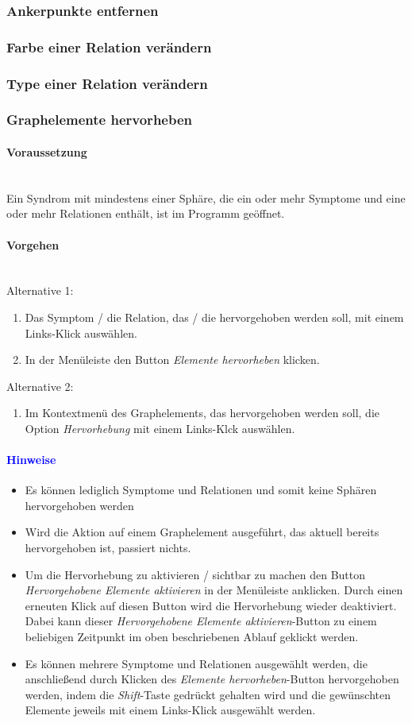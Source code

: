 \documentclass[enabledeprecatedfontcommands,fontsize=11pt,paper=a4,twoside]{scrartcl}
\newcounter{one}
\newcommand*{\hint}{\paragraph{\textcolor{blue}{Hinweise}}}
\newcommand*{\condition}{\paragraph{Voraussetzung}$\;$ \vspace{0.2cm}\\}
\newcommand*{\actions}{\paragraph{Vorgehen} $\;$\vspace{0.2cm}\\}
\begin{document}
		\subsubsection{Ankerpunkte entfernen}
		\subsubsection{Farbe einer Relation verändern}
		\subsubsection{Type einer Relation verändern}
		\subsubsection{Graphelemente hervorheben}
		\condition 	
		Ein Syndrom mit mindestens einer Sphäre, die ein oder mehr Symptome und eine oder mehr Relationen enthält, ist im Programm geöffnet. 
		\actions
		Alternative 1:
		\begin{enumerate}
			\item Das Symptom / die Relation, das / die hervorgehoben werden soll, mit einem Links-Klick auswählen. 
			\item In der Menüleiste den Button \textit{Elemente hervorheben} klicken.
		\end{enumerate}
				Alternative 2:
		\begin{enumerate}
			\item Im Kontextmenü des Graphelements, das hervorgehoben werden soll, die Option \textit{Hervorhebung} mit einem Links-Klck auswählen.
		\end{enumerate}
		\hint
		\begin{itemize}
					\item Es können lediglich Symptome und Relationen und somit keine Sphären hervorgehoben werden
					\item Wird die Aktion auf einem Graphelement ausgeführt, das aktuell bereits hervorgehoben ist, passiert nichts.
					\item Um die Hervorhebung zu aktivieren / sichtbar zu machen den Button \textit{Hervorgehobene Elemente aktivieren} in der Menüleiste anklicken. Durch einen erneuten Klick auf diesen Button wird die Hervorhebung wieder deaktiviert. Dabei kann dieser \textit{Hervorgehobene Elemente aktivieren}-Button zu einem beliebigen Zeitpunkt im oben beschriebenen Ablauf geklickt werden.
					\item Es können mehrere Symptome und Relationen ausgewählt werden, die anschließend durch Klicken des \textit{Elemente hervorheben}-Button hervorgehoben werden, indem die \textit{Shift}-Taste gedrückt gehalten wird und die gewünschten Elemente jeweils mit einem Links-Klick ausgewählt werden.
		\end{itemize}
\end{document}
